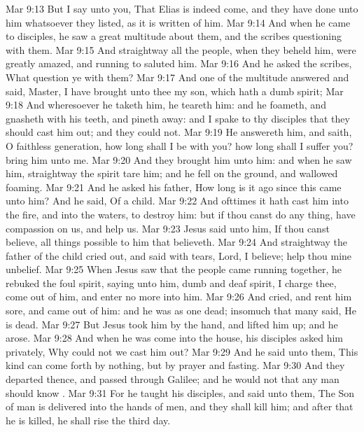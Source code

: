 \vs Mar 9:13 But I say unto you, That Elias is indeed come, and they have done unto him whatsoever they listed, as it is written of him.
\vs Mar 9:14 And when he came to  disciples, he saw a great multitude about them, and the scribes questioning with them.
\vs Mar 9:15 And straightway all the people, when they beheld him, were greatly amazed, and running to  saluted him.
\vs Mar 9:16 And he asked the scribes, What question ye with them?
\vs Mar 9:17 And one of the multitude answered and said, Master, I have brought unto thee my son, which hath a dumb spirit;
\vs Mar 9:18 And wheresoever he taketh him, he teareth him: and he foameth, and gnasheth with his teeth, and pineth away: and I spake to thy disciples that they should cast him out; and they could not.
\vs Mar 9:19 He answereth him, and saith, O faithless generation, how long shall I be with you? how long shall I suffer you? bring him unto me.
\vs Mar 9:20 And they brought him unto him: and when he saw him, straightway the spirit tare him; and he fell on the ground, and wallowed foaming.
\vs Mar 9:21 And he asked his father, How long is it ago since this came unto him? And he said, Of a child.
\vs Mar 9:22 And ofttimes it hath cast him into the fire, and into the waters, to destroy him: but if thou canst do any thing, have compassion on us, and help us.
\vs Mar 9:23 Jesus said unto him, If thou canst believe, all things  possible to him that believeth.
\vs Mar 9:24 And straightway the father of the child cried out, and said with tears, Lord, I believe; help thou mine unbelief.
\vs Mar 9:25 When Jesus saw that the people came running together, he rebuked the foul spirit, saying unto him,  dumb and deaf spirit, I charge thee, come out of him, and enter no more into him.
\vs Mar 9:26 And  cried, and rent him sore, and came out of him: and he was as one dead; insomuch that many said, He is dead.
\vs Mar 9:27 But Jesus took him by the hand, and lifted him up; and he arose.
\vs Mar 9:28 And when he was come into the house, his disciples asked him privately, Why could not we cast him out?
\vs Mar 9:29 And he said unto them, This kind can come forth by nothing, but by prayer and fasting.
\vs Mar 9:30 And they departed thence, and passed through Galilee; and he would not that any man should know .
\vs Mar 9:31 For he taught his disciples, and said unto them, The Son of man is delivered into the hands of men, and they shall kill him; and after that he is killed, he shall rise the third day.

